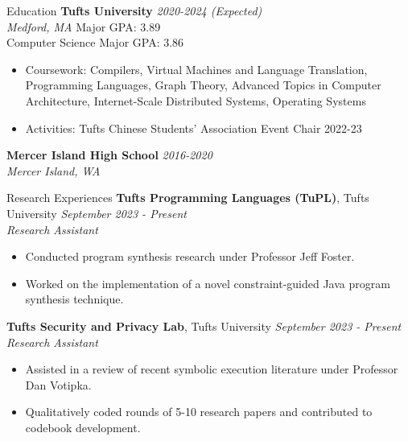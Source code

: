 \documentclass{resume} %
\begin{document}

\begin{rSection}{Education}
{\bf Tufts University} \hfill {\em 2020-2024 (Expected)} 
\\ {\it Medford, MA} \hfill { Major GPA: 3.89 }
\\ Computer Science Major \hfill { GPA: 3.86 }
\begin{itemize}
    \item Coursework: Compilers, Virtual Machines and Language Translation, Programming Languages, Graph Theory, Advanced Topics in Computer Architecture, Internet-Scale Distributed Systems, Operating Systems 
    \item Activities: Tufts Chinese Students' Association Event Chair 2022-23
\end{itemize}
{\bf Mercer Island High School} \hfill {\em 2016-2020} 
\\ {\it Mercer Island, WA}

\end{rSection}
\begin{rSection}{Research Experiences}
{\bf Tufts Programming Languages (TuPL)}{, Tufts University} \hfill {\em September 2023 - Present}\\
{\it Research Assistant}
\begin{itemize}
    \item Conducted program synthesis research under Professor Jeff Foster.
    \item Worked on the implementation of a novel constraint-guided Java program synthesis technique.
\end{itemize}
{\bf Tufts Security and Privacy Lab}{, Tufts University} \hfill {\em September 2023 - Present}\\
{\it Research Assistant}
\begin{itemize}
    \item Assisted in a review of recent symbolic execution literature under Professor Dan Votipka.
    \item Qualitatively coded rounds of 5-10 research papers and contributed to codebook development.
\end{itemize}
\end{rSection}
\end{document}
